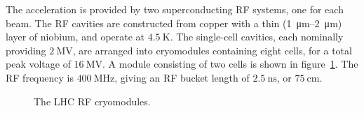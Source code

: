 The acceleration is provided by two superconducting RF systems, one for each beam. The RF cavities are constructed from copper with a thin (\SIrange[range-phrase=-]{1}{2}{\micro\meter}) layer of niobium, and operate at $\SI{4.5}{\kelvin}$. The single-cell cavities, each nominally providing $\SI{2}{\mega\volt}$, are arranged into cryomodules containing eight cells, for a total peak voltage of $\SI{16}{\mega\volt}$. A module consisting of two cells is shown in figure~\ref{fig:RF-module}. The RF frequency is $\SI{400}{\mega\hertz}$, giving an RF bucket length of $\SI{2.5}{\nano\second}$, or $\SI{75}{\centi\meter}$. 

\begin{figure}[htbp]
	\centering
	\hfill
	\caption{The LHC RF cryomodules.}
	\label{fig:RF-module}
\end{figure}

